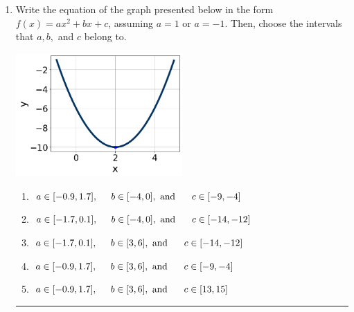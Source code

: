 \documentclass[14pt]{extbook}
\newcommand{\litem}[1]{\item#1\hspace*{-1cm}\rule{\textwidth}{0.4pt}}
\begin{document}
\begin{enumerate}
{\begin{enumerate}[label=\Alph*.]
\end{enumerate} }
\litem{
Write the equation of the graph presented below in the form $f(x)=ax^2+bx+c$, assuming  $a=1$ or $a=-1$. Then, choose the intervals that $a, b,$ and $c$ belong to.
\begin{center}
    \includegraphics[width=0.5\textwidth]{../Figures/quadraticGraphToEquationCopyB.png}
\end{center}
\begin{enumerate}[label=\Alph*.]
\item \( a \in [-0.9, 1.7], \hspace*{5mm} b \in [-4, 0], \text{ and } \hspace*{5mm} c \in [-9, -4] \)
\item \( a \in [-1.7, 0.1], \hspace*{5mm} b \in [-4, 0], \text{ and } \hspace*{5mm} c \in [-14, -12] \)
\item \( a \in [-1.7, 0.1], \hspace*{5mm} b \in [3, 6], \text{ and } \hspace*{5mm} c \in [-14, -12] \)
\item \( a \in [-0.9, 1.7], \hspace*{5mm} b \in [3, 6], \text{ and } \hspace*{5mm} c \in [-9, -4] \)
\item \( a \in [-0.9, 1.7], \hspace*{5mm} b \in [3, 6], \text{ and } \hspace*{5mm} c \in [13, 15] \)


\end{enumerate}}
\end{enumerate}
\end{document}

